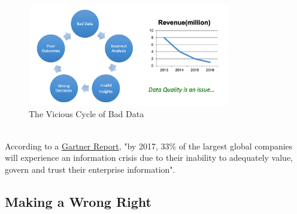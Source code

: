 \documentclass[10pt,a4paper]{article}
\begin{document}
	\begin{figure}[ht!]
 \hfill \includegraphics[width=250pt]{images/bad-data-risk}
 \hspace*{\fill}
 \caption{The Vicious Cycle of Bad Data}
 \end{figure} \\
 According to a \href{http://www.gartner.com/document/3173924?ref=solrAll&refval=167174154&qid=79dcc82b7579c163c9be01f075925356}
{Gartner Report}, "by 2017, 33\% of the largest global companies will experience an information crisis due to their inability to adequately value, govern and trust their enterprise
information".
\pagebreak
\subsection{Making a Wrong Right}
\end{document}
